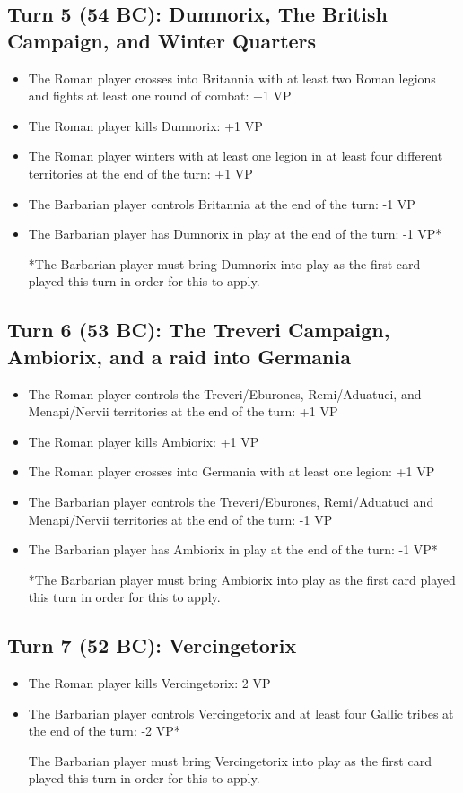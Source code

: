 \subsection{Turn 5 (54 BC): Dumnorix, The British Campaign, and Winter Quarters}
\begin{itemize}
  \setlength\itemsep{0em}
  \item The Roman player crosses into Britannia with at least two Roman legions and fights at least one round of combat: +1 VP
  \item The Roman player kills Dumnorix: +1 VP
  \item The Roman player winters with at least one legion in at least four different territories at the end of the turn: +1 VP
  \item The Barbarian player controls Britannia at the end of the turn: -1 VP
  \item The Barbarian player has Dumnorix in play at the end of the turn: -1 VP*
  
*The Barbarian player must bring Dumnorix into play as the first card played this turn in order for this to apply.
\end{itemize}

\subsection{Turn 6 (53 BC): The Treveri Campaign, Ambiorix, and a raid into Germania}
\begin{itemize}
  \setlength\itemsep{0em}
  \item The Roman player controls the Treveri/Eburones, Remi/Aduatuci, and Menapi/Nervii territories at the end of the turn: +1 VP
  \item The Roman player kills Ambiorix: +1 VP
  \item The Roman player crosses into Germania with at least one legion: +1 VP
  \item The Barbarian player controls the Treveri/Eburones, Remi/Aduatuci and Menapi/Nervii territories at the end of the turn: -1 VP
  \item The Barbarian player has Ambiorix in play at the end of the turn: -1 VP*
  
*The Barbarian player must bring Ambiorix into play as the first card played this turn in order for this to apply.
\end{itemize}

\subsection{Turn 7 (52 BC): Vercingetorix}
\begin{itemize}
  \setlength\itemsep{0em}
  \item The Roman player kills Vercingetorix: 2 VP
  \item The Barbarian player controls Vercingetorix and at least four Gallic tribes at the end of the turn: -2 VP*
  
The Barbarian player must bring Vercingetorix into play as the first card played this turn in order for this to apply.
\end{itemize}